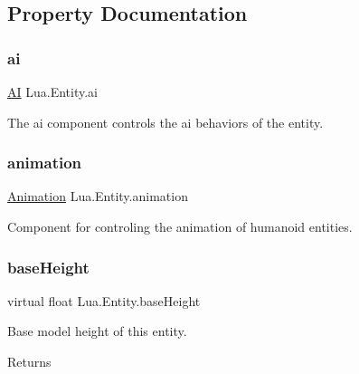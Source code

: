 \subsection{Property Documentation}
\mbox{\label{class_lua_1_1_entity_a13c1350817e444010fcbaff8d224039e}} 
\subsubsection{\texorpdfstring{ai}{ai}}
{\footnotesize\ttfamily \mbox{\hyperlink{class_lua_1_1_a_i}{AI}} Lua.\+Entity.\+ai\hspace{0.3cm}{\ttfamily [get]}}



The ai component controls the ai behaviors of the entity. 

\mbox{\label{class_lua_1_1_entity_acf080bfbeeb3a6308c2fdd4cc4993e81}} 
\subsubsection{\texorpdfstring{animation}{animation}}
{\footnotesize\ttfamily \mbox{\hyperlink{class_lua_1_1_animation}{Animation}} Lua.\+Entity.\+animation\hspace{0.3cm}{\ttfamily [get]}}



Component for controling the animation of humanoid entities. 

\mbox{\label{class_lua_1_1_entity_a1873494f26c8f90c79254b43d25d47f7}} 
\subsubsection{\texorpdfstring{baseHeight}{baseHeight}}
{\footnotesize\ttfamily virtual float Lua.\+Entity.\+base\+Height\hspace{0.3cm}{\ttfamily [get]}}



Base model height of this entity. 

\begin{DoxyReturn}{Returns}

\end{DoxyReturn}
\mbox{\label{class_lua_1_1_entity_a8d4bdecb96c327395e5ddbde88608cf4}} 
